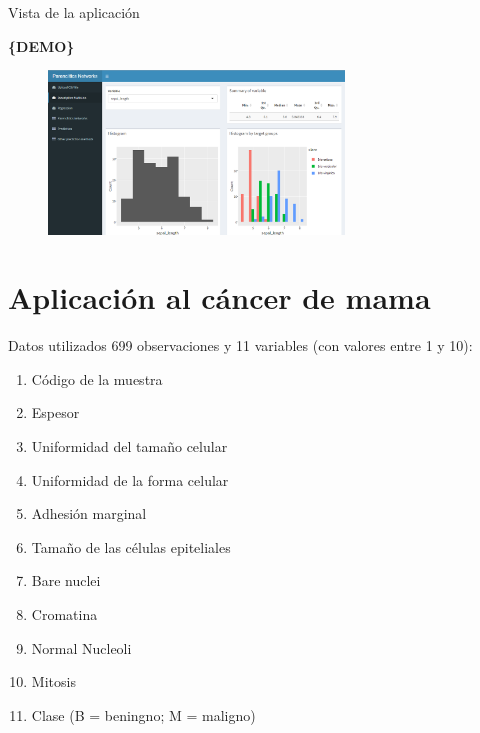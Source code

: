 \documentclass[hyperref={unicode}]{beamer}
\begin{document}
\begin{frame}{Vista de la aplicación}
	\begin{center}
	\Huge \color{ExecusharesBlue}\textbf{\{DEMO\}}
	\end{center}
	\begin{figure}[htbp!]
		\centering
		\includegraphics[width=0.7\textwidth]{../memoria/imagenes/descriptiva.png}
		\label{fig:aplicacion}
	\end{figure}
\end{frame}



\section{Aplicación al cáncer de mama}
\begin{frame}{Datos utilizados}
	699 observaciones y 11 variables (con valores entre 1 y 10):
	\begin{enumerate}
		\item Código de la muestra
		\item Espesor
		\item Uniformidad del tamaño celular
		\item Uniformidad de la forma celular
		\item Adhesión marginal
		\item Tamaño de las células epiteliales
		\item Bare nuclei
		\item Cromatina
		\item Normal Nucleoli
		\item Mitosis
		\item Clase (B = beningno; M = maligno)
	\end{enumerate}
\end{frame}
\end{document}
